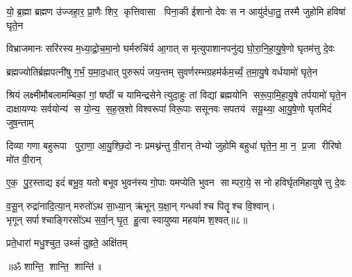 

\twolineshloka
{यो॒ ब्र॒ह्मा ब्रह्मण उ॑ज्जहा॒र॒ प्रा॒णैः शिर॒ कृत्तिवासा पिना॒की}
{ईशानो देवः स न आयु॑र्दधा॒तु॒ तस्मै जुहोमि हविषा॑ घृते॒न}

\twolineshloka
{विभ्राजमानः सरि॑रस्य म॒ध्या॒द्रो॒च॒मा॒नो घर्मरुचि॑र्य आ॒गात्}
{स मृत्युपाशानपनु॑द्य घो॒रा॒नि॒हा॒यु॒षे॒णो घृतम॑त्तु दे॒वः}

\twolineshloka
{ब्रह्मज्योतिर्ब्रह्मपत्नी॑षु  ग॒र्भं॒ य॒मा॒द॒धात् पुरुरूपं॑ जय॒न्तम्}
{सुवर्णरम्भग्रहम॑र्कम॒र्च्यं॒ त॒मा॒यु॒षे वर्धयामो॑ घृते॒न}

\twolineshloka
{श्रियं लक्ष्मीमौबलामम्बिकां॒ गां॒ षष्ठीं च यामिन्द्रसेनेत्युदा॒हुः}
{तां विद्यां ब्रह्मयोनि सरू॒पा॒मि॒हा॒यु॒षे तर्पयामो॑ घृते॒न}
\twolineshloka
{दाक्षायण्यः सर्वयोन्य॑ स यो॒न्य॒ स॒ह॒स्र॒शो विश्वरूपा॑ विरू॒पाः}
{ससूनवः सपतय॑ सयू॒थ्या॒ आ॒यु॒षे॒णो घृतमिदं॑ जुष॒न्ताम्}

\twolineshloka
{दिव्या गणा बहुरूपा पुरा॒णा॒ आ॒यु॒श्छि॒दो नः प्रमथ्न॑न्तु वी॒रान्}
{तेभ्यो जुहोमि बहुधा॑ घृते॒न॒ मा॒ न॒ प्र॒जा रीरिषो मो॑त वी॒रान्}

\twolineshloka
{ए॒क॒ पु॒र॒स्ताद्य इदं॑ बभू॒व॒ यतो बभूव भुवन॑स्य गो॒पाः}
{यमप्येति भुवन साम्परा॒ये॒ स नो हविर्घृतमिहायुषेत्तु दे॒वः}

व॒सू॒न् रुद्रा॑नादि॒त्या॒न् मरुतो॑ऽथ सा॒ध्या॒न् ऋ॑भून् य॒क्षा॒न् गन्धर्वाश्च पितॄश्च वि॒श्वान्।\\
 भृगून् सर्पाश्चाङ्गिरसो॑ऽथ स॒र्वा॒न् घृ॒त॒ हु॒त्वा स्वायुष्या महया॑म श॒श्वत्॥८॥

{प्रते॒धारा॑ मधु॒श्चुत॒ उथ्सं॑ दुह्रते॒ अक्षि॑तम्}

\centerline{॥ॐ शान्ति॒ शान्ति॒ शान्ति॑॥}